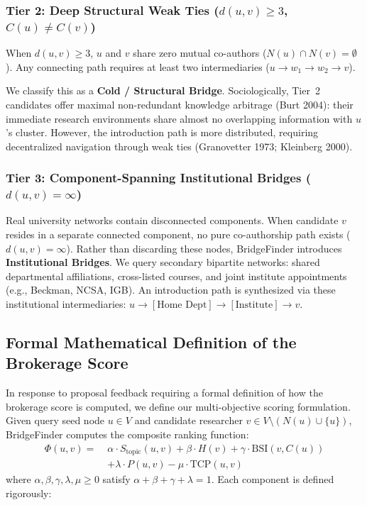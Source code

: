 \subsubsection{Tier 2: Deep Structural Weak Ties ($d(u, v) \ge 3$, $C(u) \neq C(v)$)}
When $d(u, v) \ge 3$, $u$ and $v$ share zero mutual co-authors ($N(u) \cap N(v) = \emptyset$). Any connecting path requires at least two intermediaries ($u \to w_1 \to w_2 \to v$). 

We classify this as a \textbf{Cold / Structural Bridge}. Sociologically, Tier~2 candidates offer maximal non-redundant knowledge arbitrage (Burt 2004): their immediate research environments share almost no overlapping information with $u$'s cluster. However, the introduction path is more distributed, requiring decentralized navigation through weak ties (Granovetter 1973; Kleinberg 2000).

\subsubsection{Tier 3: Component-Spanning Institutional Bridges ($d(u, v) = \infty$)}
Real university networks contain disconnected components. When candidate $v$ resides in a separate connected component, no pure co-authorship path exists ($d(u, v) = \infty$). Rather than discarding these nodes, BridgeFinder introduces \textbf{Institutional Bridges}. We query secondary bipartite networks: shared departmental affiliations, cross-listed courses, and joint institute appointments (e.g., Beckman, NCSA, IGB). An introduction path is synthesized via these institutional intermediaries: $u \to [\text{Home Dept}] \to [\text{Institute}] \to v$.


\subsection{Formal Mathematical Definition of the Brokerage Score}
\label{sec:brokerage_score}

In response to proposal feedback requiring a formal definition of how the brokerage score is computed, we define our multi-objective scoring formulation. Given query seed node $u \in V$ and candidate researcher $v \in V \setminus (N(u) \cup \{u\})$, BridgeFinder computes the composite ranking function:
\begin{align}
    \Phi(u, v) = \; &\alpha \cdot S_{\text{topic}}(u, v) + \beta \cdot H(v) + \gamma \cdot \text{BSI}(v, C(u)) \nonumber \\
    &+ \lambda \cdot P(u, v) - \mu \cdot \text{TCP}(u, v)
    \label{eq:unified_score}
\end{align}
where $\alpha, \beta, \gamma, \lambda, \mu \ge 0$ satisfy $\alpha + \beta + \gamma + \lambda = 1$. Each component is defined rigorously:

